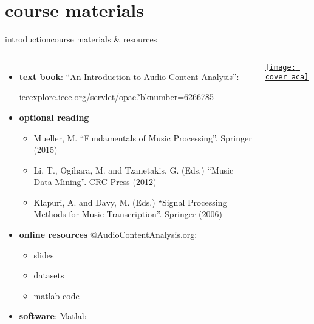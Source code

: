     \section[course materials]{course materials}
        \begin{frame}{introduction}{course materials \& resources}
            \vspace{-4mm}
            \begin{columns}[T]
                    \begin{itemize}
                        \item   \textbf{text book}: ``An Introduction to Audio Content Analysis'':
                        
                            \href{https://ieeexplore.ieee.org/servlet/opac?bknumber=6266785}{ieeexplore.ieee.org/servlet/opac?bknumber=6266785}

                        \smallskip
                        \item<2->  \textbf{optional reading}
                            
                            \begin{itemize}
                                \item   \footnotesize Mueller, M. ``Fundamentals of Music Processing''. Springer (2015)
                                \item   \footnotesize Li, T., Ogihara, M. and Tzanetakis, G.  (Eds.) ``Music Data Mining''. CRC Press (2012)
                                \item   \footnotesize Klapuri, A. and Davy, M. (Eds.) ``Signal Processing Methods for Music Transcription''. Springer (2006)
                            \end{itemize}
                            \normalsize

                        \smallskip
                        \item<3->   \textbf{online resources} @AudioContentAnalysis.org: 
                            \begin{itemize}
                                \item   slides
                                \item   datasets
                                \item   matlab code
                            \end{itemize}
                        \smallskip
                        \item<4->   \textbf{software}: Matlab
                    \end{itemize}
                     \href{https://ieeexplore.ieee.org/servlet/opac?bknumber=6266785}{\texttt{[image: cover\_aca]}}
                    \vspace{40mm}
             \end{columns}
       \end{frame}


